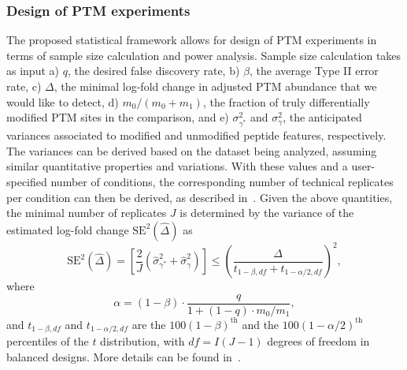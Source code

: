 \documentclass{mcp}
\begin{document}
\subsubsection{Design of PTM experiments}
\label{sec:design}

The proposed statistical framework allows for design of PTM experiments in terms of sample size calculation and power analysis. 
Sample size calculation takes as input a) $q$, the desired false discovery rate, b) $\beta$, the average Type II error rate, c) $\Delta$, the minimal log-fold change in adjusted PTM abundance that we would like to detect, d) $m_0 / (m_0 + m_1)$, the fraction of truly differentially modified PTM sites in the comparison, and e) $\sigma_{\gamma^{\ast}}^{2}$ and $\sigma_{\gamma}^{2}$, the anticipated variances associated to modified and unmodified peptide features, respectively. The variances can be derived based on the dataset being analyzed, assuming similar quantitative properties and variations. With these values and a user-specified number of conditions, the corresponding number of technical replicates per condition can then be derived, as described in~\cite{kutner_etal_04a}. Given the above quantities, the minimal number of replicates $J$ is determined by the variance of the estimated log-fold change $\mathrm{SE}^{2}(\hat{\Delta})$ as
\[
\mathrm{SE}^{2}(\hat{\Delta}) = \left[ \frac{2}{J} \left( \hat{\sigma}_{\gamma^{\ast}}^{2} + \hat{\sigma}_{\gamma}^{2} \right) \right]
\leq \left( \frac{\Delta}{t_{1-\beta, df} + t_{1-\alpha /2, df}} \right)^{2},
\]
where 
\[
\alpha = (1 - \beta) \cdot \frac{q}{1 + (1-q) \cdot m_0 / m_1},
\]
and $t_{1-\beta, df}$ and $t_{1-\alpha /2, df}$ are the $100(1-\beta)^{\text{th}}$ and the $100(1-\alpha /2)^{\text{th}}$ percentiles of the $t$ distribution, with $df = I(J-1)$ degrees of freedom in balanced designs. More details can be found in~\cite{oberg_vitek_09a}. 
\end{document}

